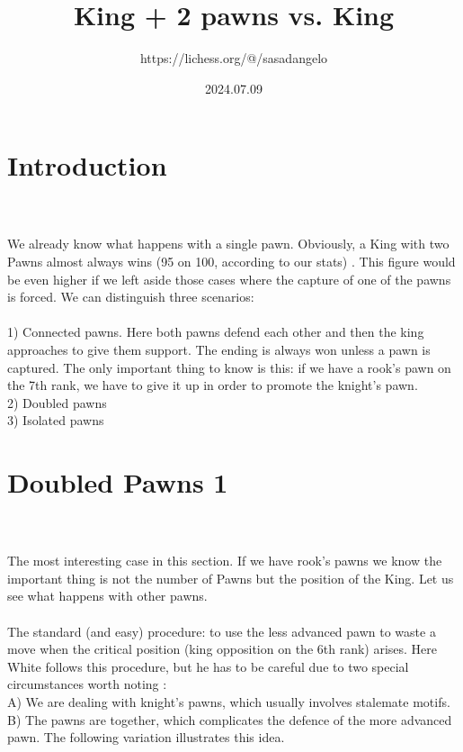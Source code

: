 \documentclass{article}
\title{King + 2 pawns vs. King}
\author{https://lichess.org/@/sasadangelo}
\date{2024.07.09}
\begin{document}
\begin{titlepage}
\maketitle
\end{titlepage}
\section{ Introduction}

\\
\\
We already know what happens with a single pawn. Obviously, a King with two Pawns almost always wins (95 on 100, according to our stats) . This figure would be even higher if we left aside those cases where the capture of one of the pawns is forced. We can distinguish three scenarios:\\\\1) Connected pawns. Here both pawns defend each other and then the king approaches to give them support. The ending is always won unless a pawn is captured. The only important thing to know is this: if we have a rook's pawn on the 7th rank, we have to give it up in order to promote the knight's pawn.\\2) Doubled pawns\\3) Isolated pawns\section{ Doubled Pawns 1}

\\
\\
The most interesting case in this section. If we have rook's pawns we know the important thing is not the number of Pawns but the position of the King. Let us see what happens with other pawns.\\\\The standard (and easy) procedure: to use the less advanced pawn to waste a move when the critical position (king opposition on the 6th rank) arises. Here White follows this procedure, but he has to be careful due to two special circumstances worth noting :\\A) We are dealing with knight's pawns, which usually involves stalemate motifs.\\B) The pawns are together, which complicates the defence of the more advanced pawn. The following variation illustrates this idea.\\
\end{document}
